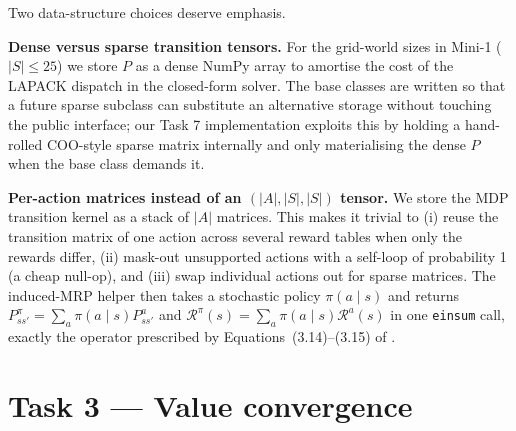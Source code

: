 \documentclass[11pt]{article}
\begin{document}
Two data-structure choices deserve emphasis.

\textbf{Dense versus sparse transition tensors.}
For the grid-world sizes in Mini-1 ($|S|\!\le\!25$) we store $P$ as a dense
NumPy array to amortise the cost of the LAPACK dispatch in the closed-form
solver. The base classes are written so that a future sparse subclass can
substitute an alternative storage without touching the public interface; our
Task 7 implementation exploits this by holding a hand-rolled COO-style sparse
matrix internally and only materialising the dense $P$ when the base class
demands it.

\textbf{Per-action matrices instead of an $(|A|,|S|,|S|)$ tensor.}
We store the MDP transition kernel as a stack of $|A|$ matrices. This makes
it trivial to (i) reuse the transition matrix of one action across several
reward tables when only the rewards differ, (ii) mask-out unsupported
actions with a self-loop of probability 1 (a cheap null-op), and (iii) swap
individual actions out for sparse matrices. The induced-MRP helper then
takes a stochastic policy $\pi(a\mid s)$ and returns
$P^{\pi}_{ss'} \!=\! \sum_a \pi(a\mid s) P^{a}_{ss'}$ and
$\mathcal{R}^{\pi}(s) \!=\! \sum_a \pi(a\mid s)\mathcal{R}^{a}(s)$ in one
\texttt{einsum} call, exactly the operator prescribed by
Equations~(3.14)--(3.15) of \citet{sutton2018}.

\section{Task 3 --- Value convergence}
\label{sec:task3}
\end{document}
